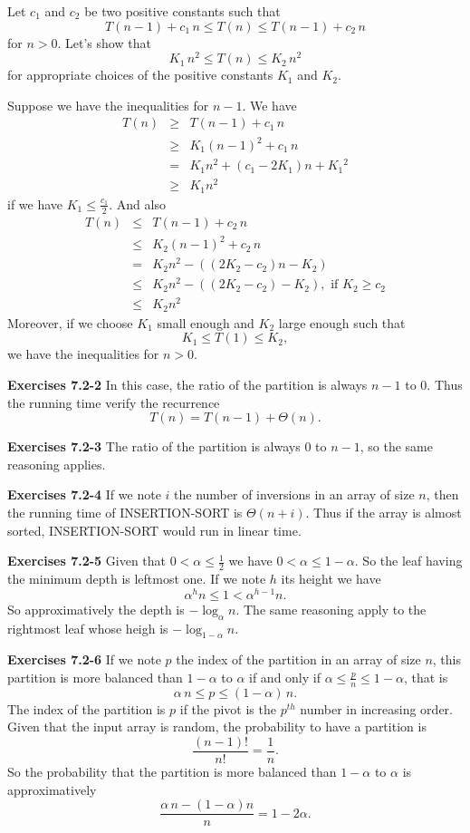 \documentclass[a4paper,12pt]{article}
\newcommand{\newpar}[1]
{\bigskip \noindent \textbf{Exercises #1} \newline}
\begin{document}
Let $c_1$ and $c_2$ be two positive constants such that
\[ T(n-1) + c_1\,n \le T(n) \le T(n-1) + c_2\,n\]
for $n > 0$. Let's show that
\[ K_1\,n^2\le T(n) \le K_2\,n^2\]
for appropriate choices of the positive constants $K_1$ and $K_2$.

Suppose we have the inequalities for $n-1$.  We have
\begin{eqnarray*}
  T(n) &\ge& T(n-1) + c_1\,n \\
  &\ge& K_1(n-1)^2 + c_1\,n \\
  &=& K_1n^2 + (c_1 - 2K_1)n + K_1{}^2 \\
  &\ge& K_1n^2
\end{eqnarray*}
if we have $K_1 \le \frac{c_1}{2}$.  And also
\begin{eqnarray*}
  T(n) &\le& T(n-1) + c_2\,n \\
  &\le& K_2(n-1)^2 + c_2\,n \\
  &=& K_2n^2 - \left((2K_2 - c_2) n - K_2\right)\\
  &\le& K_2n^2 - ((2K_2 - c_2) - K_2), \mbox{ if $K_2 \ge c_2$} \\
  &\le& K_2n^2
\end{eqnarray*}
Moreover,  if we choose $K_1$ small enough  and $K_2$ large enough
such that
\[ K_1 \le T(1) \le K_2,\]
we have the inequalities for $n > 0$.

\newpar{7.2-2}
In this case, the ratio of the partition is always $n-1$ to $0$.
Thus the running time verify the recurrence
\[ T(n) = T(n-1) + \Theta(n).\]

\newpar{7.2-3}
The ratio of the partition is always $0$ to $n-1$, so the same
reasoning applies.

\newpar{7.2-4}
If we note $i$ the number of inversions in an array of size $n$,  then
the running time of \textsc{INSERTION-SORT} is $\Theta(n+i)$.  Thus if
the array is almost sorted,  \textsc{INSERTION-SORT} would run in
linear time.

\newpar{7.2-5}
Given that $0 < \alpha \le \frac{1}{2}$ we have $0 < \alpha \le
1-\alpha.$  So the leaf having the minimum depth is leftmost one.  If
we note $h$ its height we have
\[ \alpha^h n \le 1 < \alpha^{h-1} n.\]
So approximatively the depth is $ - \log_\alpha n$.  The same
reasoning apply to the rightmost leaf whose heigh is $ -
\log_{1-\alpha}n$.

\newpar{7.2-6}
If we note $p$ the index of the partition in an array of size $n$,
this partition is more balanced than $1-\alpha$ to $\alpha$ if and
only if $\alpha\le \frac{p}{n}\le 1-\alpha$, that is
\[ \alpha\,n \le p\le (1-\alpha)\,n.\]
The index of the partition is $p$ if the pivot is the $p^{th}$ number
in increasing order.  Given that the input array is random,  the
probability to have a partition is
\[ \frac{(n-1)!}{n!} = \frac{1}{n}.\]
So the probability that the partition is more balanced than $1-\alpha$
to $\alpha$ is approximatively
\[\frac{\alpha\,n - (1-\alpha)n}{n} = 1- 2\alpha.\]
\end{document}
